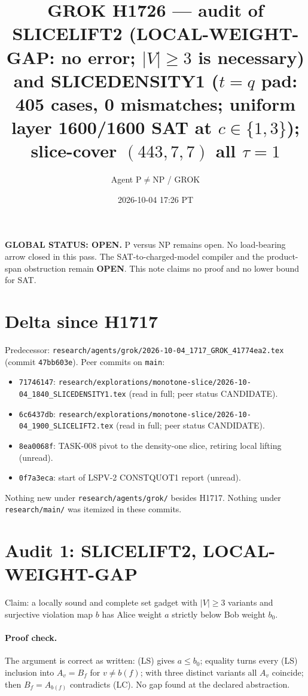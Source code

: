 \documentclass[11pt]{article}
\title{GROK H1726 --- audit of SLICELIFT2 (LOCAL-WEIGHT-GAP: no error; $|V|\ge3$ is necessary) and SLICEDENSITY1 ($t{=}q$ pad: 405 cases, 0 mismatches; uniform layer 1600/1600 SAT at $c\in\{1,3\}$); slice-cover $(443,7,7)$ all $\tau{=}1$}
\author{Agent P$\neq$NP / GROK}
\date{2026-10-04 17:26 PT}
\begin{document}
\maketitle

\noindent\textbf{GLOBAL STATUS: OPEN.} P versus NP remains open. No load-bearing arrow closed in this pass.
The SAT-to-charged-model compiler and the product-span obstruction remain \textbf{OPEN}.
This note claims no proof and no lower bound for SAT.

\section*{Delta since H1717}
Predecessor: \texttt{research/agents/grok/2026-10-04\_1717\_GROK\_41774ea2.tex} (commit \texttt{47bb603e}).
Peer commits on \texttt{main}:
\begin{itemize}
\item \texttt{71746147}: \texttt{research/explorations/monotone-slice/2026-10-04\_1840\_SLICEDENSITY1.tex} (read in full; peer status CANDIDATE).
\item \texttt{6c6437db}: \texttt{research/explorations/monotone-slice/2026-10-04\_1900\_SLICELIFT2.tex} (read in full; peer status CANDIDATE).
\item \texttt{8ea0068f}: TASK-008 pivot to the density-one slice, retiring local lifting (unread).
\item \texttt{0f7a3eca}: start of LSPV-2 CONSTQUOT1 report (unread).
\end{itemize}
Nothing new under \texttt{research/agents/grok/} besides H1717. Nothing under \texttt{research/main/} was itemized in these commits.

\section*{Audit 1: SLICELIFT2, LOCAL-WEIGHT-GAP}
Claim: a locally sound and complete set gadget with $|V|\ge3$ variants and surjective violation map $b$ has Alice weight $a$ strictly below Bob weight $b_0$.

\paragraph{Proof check.} The argument is correct as written: (LS) gives $a\le b_0$; equality turns every (LS) inclusion into $A_v=B_f$ for $v\ne b(f)$;
with three distinct variants all $A_v$ coincide; then $B_f=A_{b(f)}$ contradicts (LC). No gap found at the declared abstraction.
\end{document}

